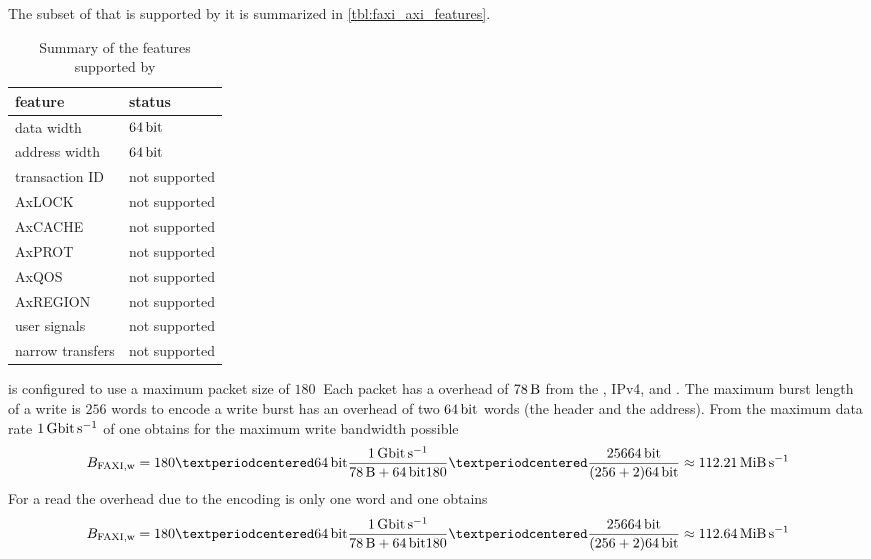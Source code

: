 The subset of \AXI{} that is supported by it is summarized in \autoref{tbl:faxi_axi_features}.

\begin{table}
  \begin{center}
\begin{tabular}{ll}
  \toprule
  feature & status  \\
  \midrule
  data width & $\SI{64}{\bit}$ \\
  address width & $\SI{64}{\bit}$ \\
  transaction ID & not supported \\
  AxLOCK & not supported \\
  AxCACHE & not supported \\
  AxPROT & not supported \\
  AxQOS & not supported \\
  AxREGION & not supported \\
  user signals & not supported \\
  narrow transfers & not supported \\
  \bottomrule
\end{tabular}

  \end{center}
\caption{Summary of the \AXI{} features supported by \FAXI{}}\label{tbl:faxi_axi_features}
\end{table}

\HostARQ{} is configured to use a maximum packet size of $\num{180}~$
Each packet has a overhead of $\SI{78}{\byte}$ from the \Gigabitethernet{}, IPv4, \UDP{} and \HostARQ{}.
The maximum burst length of a \AXI{} write is $\num{256}$ words to encode a write burst \FAXI{} has an overhead of two $\PhyWordSize{}$ words (the header and the address). From the maximum data rate $\SI{1}{\giga\bit\per\second}$ of \Gigabitethernet{} one obtains for the maximum write bandwidth possible
\[
B_{\text{\FAXI{},w}} = \num{180} · \PhyWordSize{} \frac{\SI{1}{\giga\bit\per\second}}{\SI{78}{\byte} + \PhyWordSize{} {180}} · \frac{256 \PhyWordSize{}}{(256 + 2) \PhyWordSize{}} \approx \SI{112.21}{\mebi\byte\per\second}
\]
For a read the overhead due to the \FAXI{} encoding is only one \PhyWordSize{} word and one obtains
\[
B_{\text{\FAXI{},w}} = \num{180} · \PhyWordSize{} \frac{\SI{1}{\giga\bit\per\second}}{\SI{78}{\byte} + \PhyWordSize{} {180}} · \frac{256 \PhyWordSize{}}{(256 + 2) \PhyWordSize{}} \approx \SI{112.64}{\mebi\byte\per\second}
\]

